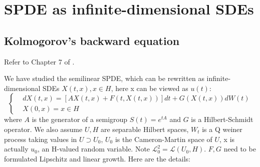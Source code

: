 \section{SPDE as infinite-dimensional SDEs}
\subsection{Kolmogorov's backward equation}
Refer to Chapter 7 of \cite{Da_Prato_Zabczyk_2002}.

We have studied the semilinear SPDE, which can be rewritten as infinite-dimensional SDEs $X(t, x), x\in H$, here x can be viewed as $u(t)$:
\begin{equation}\left\{
    \begin{aligned}
        &dX(t, x) = [AX(t, x)+F(t, X(t, x))]dt + G(X(t, x))dW(t)\\
        &X(0, x) = x\in H
    \end{aligned}\right.
\end{equation}
where $A$ is the generator of a semigroup $S(t)=e^{tA}$ and $G$ is a Hilbert-Schmidt operator. We also assume $U, H$ are separable Hilbert spaces, $W_t$ is a Q weiner process taking values in $U\supset U_0$, $U_0$ is the Cameron-Martin space of $U$, x is actually $u_0$, an H-valued random variable. Note $\mathcal{L}_0^2=\mathcal{L}(U_0, H)$. $F, G$ need to be formulated Lipschitz and linear growth. Here are the details:
